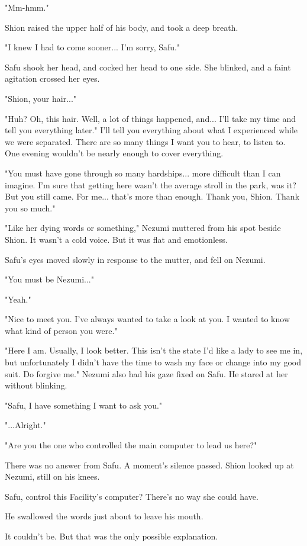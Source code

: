 "Mm-hmm."

Shion raised the upper half of his body, and took a deep breath.

"I knew I had to come sooner... I'm sorry, Safu."

Safu shook her head, and cocked her head to one side. She blinked, and a
faint agitation crossed her eyes.

"Shion, your hair..."

"Huh? Oh, this hair. Well, a lot of things happened, and... I'll take my
time and tell you everything later." I'll tell you everything about what
I experienced while we were separated. There are so many things I want
you to hear, to listen to. One evening wouldn't be nearly enough to
cover everything.

"You must have gone through so many hardships... more difficult than I
can imagine. I'm sure that getting here wasn't the average stroll in the
park, was it? But you still came. For me... that's more than enough.
Thank you, Shion. Thank you so much."

"Like her dying words or something," Nezumi muttered from his spot
beside Shion. It wasn't a cold voice. But it was flat and emotionless.

Safu's eyes moved slowly in response to the mutter, and fell on Nezumi.

"You must be Nezumi..."

"Yeah."

"Nice to meet you. I've always wanted to take a look at you. I wanted to
know what kind of person you were."

"Here I am. Usually, I look better. This isn't the state I'd like a lady
to see me in, but unfortunately I didn't have the time to wash my face
or change into my good suit. Do forgive me." Nezumi also had his gaze
fixed on Safu. He stared at her without blinking.

"Safu, I have something I want to ask you."

"...Alright."

"Are you the one who controlled the main computer to lead us here?"

There was no answer from Safu. A moment's silence passed. Shion looked
up at Nezumi, still on his knees.

Safu, control this Facility's computer? There's no way she could have.

He swallowed the words just about to leave his mouth.

It couldn't be. But that was the only possible explanation.

